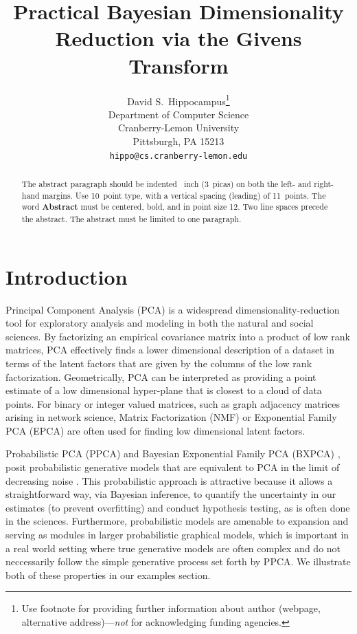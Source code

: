 \documentclass{article}
\title{Practical Bayesian Dimensionality Reduction via the Givens Transform}
\author{
  David S.~Hippocampus\thanks{Use footnote for providing further
    information about author (webpage, alternative
    address)---\emph{not} for acknowledging funding agencies.} \\
  Department of Computer Science\\
  Cranberry-Lemon University\\
  Pittsburgh, PA 15213 \\
  \texttt{hippo@cs.cranberry-lemon.edu} \\
}
\begin{document}

\maketitle

\begin{abstract}
  The abstract paragraph should be indented ~inch
  (3~picas) on both the left- and right-hand margins. Use 10~point
  type, with a vertical spacing (leading) of 11~points.  The word
  \textbf{Abstract} must be centered, bold, and in point size 12. Two
  line spaces precede the abstract. The abstract must be limited to
  one paragraph.
\end{abstract}

\section{Introduction}

Principal Component Analysis (PCA) is a widespread dimensionality-reduction tool for exploratory analysis and modeling in both the natural and social sciences. By factorizing an empirical covariance matrix into a product of low rank matrices, PCA effectively finds a lower dimensional description of a dataset in terms of the latent factors that are given by the columns of the low rank factorization. Geometrically, PCA can be interpreted as providing a point estimate of a low dimensional hyper-plane that is closest to a cloud of data points. For binary or integer valued matrices, such as graph adjacency matrices arising in network science, Matrix Factorization (NMF) \citep{lee2001algorithms} or Exponential Family PCA (EPCA) \citep{collins2001generalization} are often used for finding low dimensional latent factors.

Probabilistic PCA (PPCA) \citep{tipping1999probabilistic} and Bayesian Exponential Family PCA (BXPCA) \citep{mohamed2009bayesian}, posit probabilistic generative models that are equivalent to PCA in the limit of decreasing noise \citep[chapt.~12.2]{murphy2012machine}. This probabilistic approach is attractive because it allows a straightforward way, via Bayesian inference, to quantify the uncertainty in our estimates (to prevent overfitting) and conduct hypothesis testing, as is often done in the sciences. Furthermore, probabilistic models are amenable to expansion and serving as modules in larger probabilistic graphical models, which is important in a real world setting where true generative models are often complex and do not neccessarily follow the simple generative process set forth by PPCA. We illustrate both of these properties in our examples section.
\end{document}
